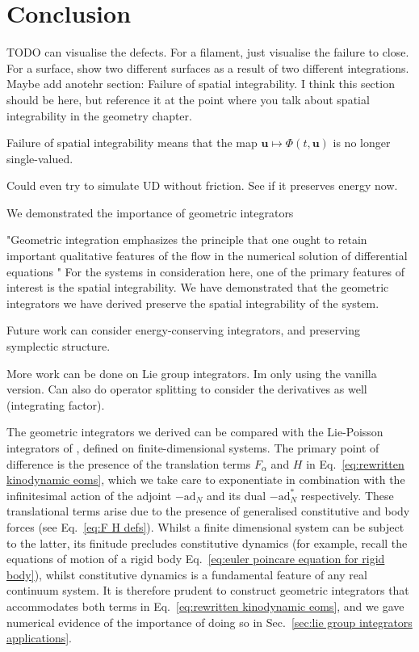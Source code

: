 
\section{Conclusion}
 
 {\color{red} TODO can visualise the defects. For a filament, just visualise the failure to close. For a surface, show two different surfaces as a result of two different integrations. Maybe add anotehr section: Failure of spatial integrability. I think this section should be here, but reference it at the point where you talk about spatial integrability in the geometry chapter.
 
 Failure of spatial integrability means that the map $\mathbf{u} \mapsto \Phi(t, \mathbf{u})$ is no longer single-valued.
 
 
 Could even try to simulate UD without friction. See if it preserves energy now.}
 
We demonstrated the importance of geometric integrators
 
 "Geometric integration emphasizes the principle that one ought to retain important qualitative features of the
flow in the numerical solution of differential equations " For the systems in consideration here, one of the primary features of interest is the spatial integrability. We have demonstrated that the geometric integrators we have derived preserve the spatial integrability of the system.

Future work can consider energy-conserving integrators, and preserving symplectic structure.
 
 More work can be done on Lie group integrators. Im only using the vanilla version. Can also do operator splitting to consider the derivatives as well (integrating factor).
 
 
 The geometric integrators we derived can be compared with the Lie-Poisson integrators of \citep{kaasHighOrderRungeKutta1999a, buddGeometricIntegrationNumerical1999, engoNumericalIntegrationLie2001}, defined on finite-dimensional systems. The primary point of difference is the presence of the translation terms $F_\alpha$ and $H$ in Eq.~\ref{eq:rewritten kinodynamic eoms}, which we take care to exponentiate in combination with the infinitesimal action of the adjoint $-\text{ad}_N$ and its dual $-\text{ad}^*_N$ respectively. These translational terms arise due to the presence of generalised constitutive and body forces (see Eq.~\ref{eq:F H defs}). Whilst a finite dimensional system can be subject to the latter, its finitude precludes constitutive dynamics (for example, recall the equations of motion of a rigid body Eq.~\ref{eq:euler poincare equation for rigid body}), whilst constitutive dynamics is a fundamental feature of any real continuum system. It is therefore prudent to construct geometric integrators that accommodates both terms in Eq.~\ref{eq:rewritten kinodynamic eoms}, and we gave numerical evidence of the importance of doing so in Sec.~\ref{sec:lie group integrators applications}.
 
